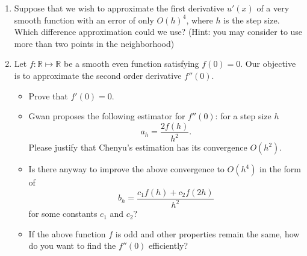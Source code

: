 \documentclass{article}
\begin{document}
\begin{enumerate}
 \item Suppose that we wish to approximate the first derivative $u'(x)$ of a very smooth function with an error of only $O(h)^4$, where $h$ is the step size. Which difference approximation could we use? (Hint: you may consider to use more than two points in the neighborhood)

 
 
 \item 
Let $f:\mathbb R\mapsto \mathbb R$ be a smooth even function 
satisfying $f(0) = 0$. 
Our objective is to approximate  the second order derivative $f''(0)$. 
\begin{itemize}
 \item Prove that $f'(0) = 0.$
 \item Gwan proposes the following estimator for $f''(0)$: for a step size $h$
 $$a_{h} = \frac{2f(h)}{h^{2}}.$$
 Please justify that Chenyu's estimation has its convergence $O(h^{2})$.
 \item Is there anyway to improve the above 
 convergence to $O(h^{4})$ in the form of 
 $$b_{h} = \frac{c_{1} f(h) + c_{2}f(2h)}{h^{2}}$$
 for some constants $c_{1}$ and $c_{2}$?
 \item If the above function $f$ is odd and other properties remain the same, how do you want to find the $f''(0)$ efficiently?
\end{itemize}

\iffalse
{\bf Solution}
\begin{itemize}
 \item it can be directly shown from the definition of $f'$.
 \item $f^{n}(0) = 0$ for all odd number $n$. Therefore, 
 taylor expansion gives 
 $$f(h) = \frac 1 2 h^{2} f''(0) + \frac 1 {24} h^{4}f^{(4)}(0) + O(h^{6}),$$
 and the result follows.
 \item we can combine the above taylor expansion with
 $$f(2h) = 2h^{2} f''(0) + \frac 2 3 h^{4} f^{(4)}(0) + O(h^{6}).$$
 It yields that, with $c_{1} = 8/3$ and $c_{2} = - 1/6$, 
 $$c_{1} f(h) + c_{2}f(2h) = h^{2}f''(0) + O(h^{6}).$$
 \item 
 If $f$ is odd, then $f''(0) = 0$ and no estimate is needed any more.
\end{itemize}
\fi

\end{enumerate}
\end{document}
